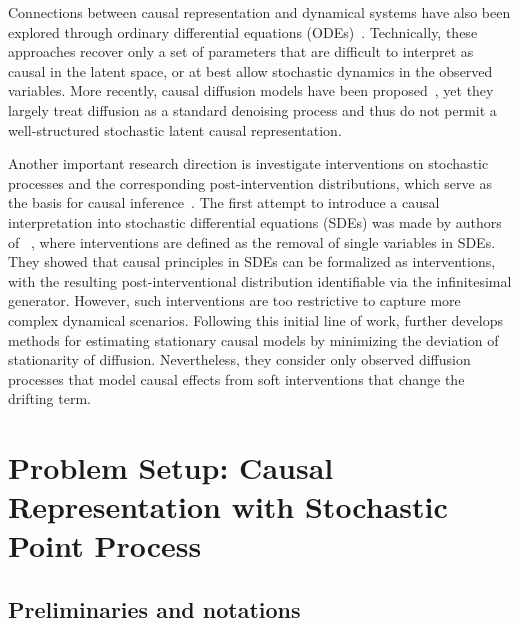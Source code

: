 \documentclass[10pt]{article}
\numberwithin{figure}{section}
\begin{document}
Connections between causal representation and dynamical systems have also been explored through ordinary differential equations (ODEs)~\citep{yaoMarryingCausalRepresentation2024}. Technically, these approaches recover only a set of parameters that are difficult to interpret as causal in the latent space, or at best allow stochastic dynamics in the observed variables. More recently, causal diffusion models have been proposed~\citep{karimimamaghanDiffusionBasedCausalRepresentation2024,pmlr-v238-lorch24a}, yet they largely treat diffusion as a standard denoising process and thus do not permit a well-structured stochastic latent causal representation. 

Another important research direction is investigate interventions on stochastic processes and the corresponding post-intervention distributions, which serve as the basis for causal inference~\citep{sokol_intervention_2013,bongers_causal_2018,bongers_causal_2022,boeken_dynamic_2024,pmlr-v238-lorch24a}. The first attempt to introduce a causal interpretation into stochastic differential equations (SDEs) was made by authors of ~\citep{sokol_causal_2014}, where interventions are defined as the removal of single variables in SDEs. They showed that causal principles in SDEs can be formalized as interventions, with the resulting post-interventional distribution identifiable via the infinitesimal generator. However, such interventions are too restrictive to capture more complex dynamical scenarios. Following this initial line of work, \citep{bongers_causal_2018} further develops methods for estimating stationary causal models by minimizing the deviation of stationarity of diffusion. Nevertheless, they consider only observed diffusion processes that model causal effects from soft interventions that change the drifting term.




\section{Problem Setup: Causal Representation with Stochastic Point Process}

\subsection{Preliminaries and notations}
\end{document}
